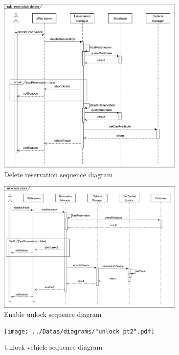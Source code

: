 \begin{figure}[H]
	\includegraphics[width=350px]{../Datas/diagrams/res-del.pdf}
	\caption{Delete reservation sequence diagram}
	\label{fig:del-res}
\end{figure}

\begin{figure}[H]
        \includegraphics[width=350px]{../Datas/diagrams/unlock.pdf}
        \caption{Enable unlock sequence diagram}
        \label{fig:unlock-pt1-seq-dig}
\end{figure}

\begin{figure}[H]
        \texttt{[image: ../Datas/diagrams/"unlock pt2".pdf]}
        \caption{Unlock vehicle sequence diagram}
        \label{fig:unlock-pt2-seq-dig}
\end{figure}

